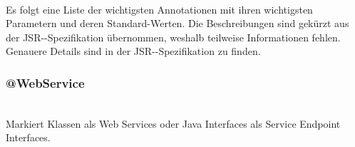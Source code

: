 \documentclass[runningheads]{llncs}
\begin{document}
    \paragraph{}
    Es folgt eine Liste der wichtigsten Annotationen mit ihren wichtigsten Pa\-ra\-me\-tern und
    deren Stan\-dard-\linebreak[0]Wer\-ten. Die Beschreibungen sind gekürzt aus der
    JSR--\linebreak[0]Spe\-zi\-fi\-ka\-tion\cite{jsr_181} übernommen, weshalb
    teilweise Informationen fehlen. Genauere Details sind in der
    JSR--\linebreak[0]Spe\-zi\-fi\-ka\-tion\cite{jsr_181} zu finden.\\ \vfill

    \subsubsection{@WebService}\ \\
      Markiert Klassen als Web Services oder Java Interfaces als Service Endpoint Interfaces.
\end{document}
